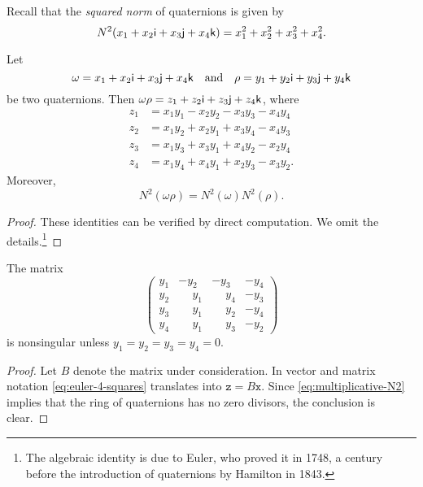 \begin{rem}
    Recall that the \textsl{squared norm} of quaternions is given by
    $$
        N^2(x_1+x_2\mathsf{i}+x_3\mathsf{j}+x_4\mathsf{k})=x_1^2+x_2^2+x_3^2+x_4^2.
    $$
\end{rem}

\begin{thm}\label{thm:euler-4-squares}
    Let
    $$
        \omega=x_1+x_2\mathsf{i}+x_3\mathsf{j}+x_4\mathsf{k}
        \quad\text{and}\quad
        \rho=y_1+y_2\mathsf{i}+y_3\mathsf{j}+y_4\mathsf{k}
    $$
    be two quaternions. Then
    $\omega\rho=z_1+z_2\mathsf{i}+z_3\mathsf{j}+z_4\mathsf{k}$, where
    \begin{equation}\label{eq:euler-4-squares}
        \begin{aligned}
            z_1 &= x_1y_1 - x_2y_2 - x_3y_3 - x_4y_4 \\
            z_2 &= x_1y_2 + x_2y_1 + x_3y_4 - x_4y_3 \\
            z_3 &= x_1y_3 + x_3y_1 + x_4y_2 - x_2y_4 \\
            z_4 &= x_1y_4 + x_4y_1 + x_2y_3 - x_3y_2.
        \end{aligned}
    \end{equation}
    Moreover,
    \begin{equation}\label{eq:multiplicative-N2}
        N^2(\omega\rho)=N^2(\omega)N^2(\rho).
    \end{equation}
\end{thm}

\begin{proof}
    These identities can be verified by direct computation. We omit the details.\footnote{The algebraic identity is due to Euler, who proved it in 1748, a century before the introduction of quaternions by Hamilton in 1843.}
\end{proof}

\begin{cor}\label{cor:nonsingular-4-square-matrix}
    The matrix
    $$
        \begin{pmatrix}
            y_1 &-y_2   &-y_3   &-y_4\\
            y_2 &\phantom-y_1   &\phantom-y_4   &-y_3\\
            y_3 &\phantom-y_1   &\phantom-y_2   &-y_4\\
            y_4 &\phantom-y_1   &\phantom-y_3   &-y_2
        \end{pmatrix}
    $$
    is nonsingular unless $y_1=y_2=y_3=y_4=0$.
\end{cor}

\begin{proof}
    Let $B$ denote the matrix under consideration. In vector and matrix notation \eqref{eq:euler-4-squares} translates into $\mathtt z=B\mathtt x$. Since \eqref{eq:multiplicative-N2} implies that the ring of quaternions has no zero divisors, the conclusion is clear. 
\end{proof}


